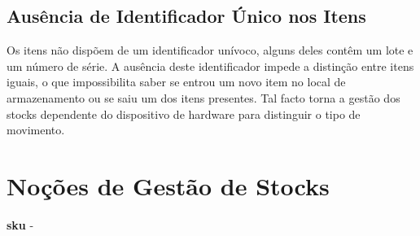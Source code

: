 \subsection{Ausência de Identificador Único nos Itens}

Os itens não dispõem de um identificador unívoco, alguns deles contêm um lote e um número de série. A ausência deste identificador impede a distinção entre itens iguais, o que impossibilita saber se entrou um novo item no local de armazenamento ou se saiu um dos itens presentes. Tal facto torna a gestão dos stocks dependente do dispositivo de hardware para distinguir o tipo de movimento.


%
%
\section{Noções de Gestão de Stocks} \label{sec24}

\textbf{\acrfull{sku}} - 